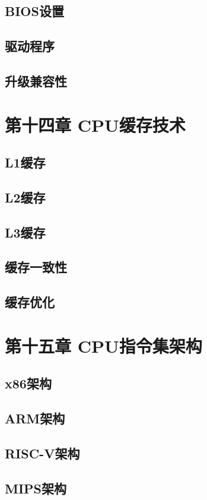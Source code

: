 \documentclass[12pt,UTF8]{ctexbook}
\begin{document}
\section{BIOS设置}
\section{驱动程序}
\section{升级兼容性}

\chapter{第十四章 CPU缓存技术}

\section{L1缓存}
\section{L2缓存}
\section{L3缓存}
\section{缓存一致性}
\section{缓存优化}

\chapter{第十五章 CPU指令集架构}

\section{x86架构}
\section{ARM架构}
\section{RISC-V架构}
\section{MIPS架构}
\end{document}
